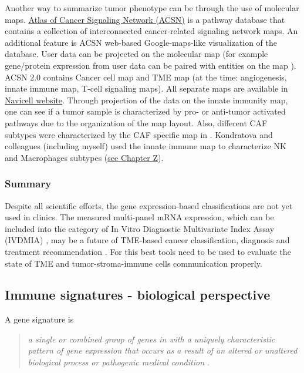 \documentclass[12pt,]{book}
\theoremstyle{definition}
\theoremstyle{definition}
\theoremstyle{definition}
\theoremstyle{remark}
\begin{document}
Another way to summarize tumor phenotype can be through the use of
molecular maps. \href{https://acsn.curie.fr/}{Atlas of Cancer Signaling
Network (ACSN)} \citep{Kuperstein2013, Kuperstein2015} is a pathway
database that contains a collection of interconnected cancer-related
signaling network maps. An additional feature is ACSN web-based
Google-maps-like visualization of the database. User data can be
projected on the molecular map (for example gene/protein expression from
user data can be paired with entities on the map ). ACSN 2.0 contains
Cancer cell map and TME map (at the time: angiogenesis, innate immune
map, T-cell signaling maps). All separate maps are available in
\href{https://navicell.curie.fr/pages/maps.html}{Navicell website}.
Through projection of the data on the innate immunity map, one can see
if a tumor sample is characterized by pro- or anti-tumor activated
pathways due to the organization of the map layout. Also, different CAF
subtypes were characterized by the CAF specific map in
\citep{Costa2018}. Kondratova and colleagues (including myself) used the
innate immune map to characterize NK and Macrophages subtypes
(\protect\hyperlink{map}{see Chapter Z}).

\hypertarget{summary-1}{%
\subsubsection{Summary}\label{summary-1}}

Despite all scientific efforts, the gene expression-based
classifications are not yet used in clinics. The measured multi-panel
mRNA expression, which can be included into the category of In Vitro
Diagnostic Multivariate Index Assay (IVDMIA)
\citep{Gyorffy2015, Ross2008}, may be a future of TME-based cancer
classification, diagnosis and treatment recommendation
\citep{Gnjatic2017}. For this best tools need to be used to evaluate the
state of TME and tumor-stroma-immune cells communication properly.

\hypertarget{immune-signatures}{%
\subsection{Immune signatures - biological
perspective}\label{immune-signatures}}

A gene signature is

\begin{quote}
\emph{a single or combined group of genes in with a uniquely
characteristic pattern of gene expression that occurs as a result of an
altered or unaltered biological process or pathogenic medical condition}
\citep{Itadani2008, Liu2008}.
\end{quote}
\end{document}

